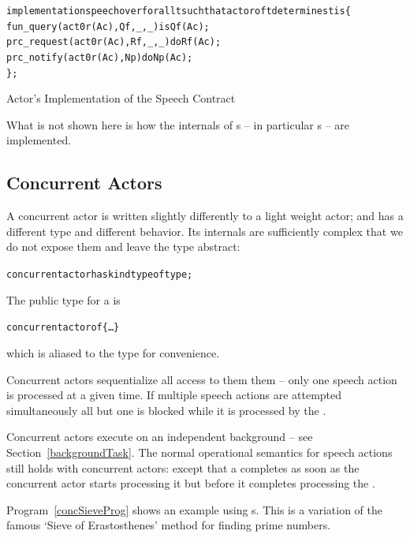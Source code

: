 \begin{program}
\begin{alltt}
implementation speech over for all t such that actor of t determines t is \{
  fun \_query(act0r(Ac),Qf,_,_) is Qf(Ac);
  prc \_request(act0r(Ac),Rf,_,_) do Rf(Ac);
  prc \_notify(act0r(Ac),Np) do Np(Ac);
\};
\end{alltt}
\caption{Actor's Implementation of the Speech Contract}
\label{actorSpeechProg}
\end{program}
\begin{aside}
What is not shown here is how the internals of s -- in particular  s -- are implemented.
\end{aside}

\subsection{Concurrent Actors}
\label{concActor}
A concurrent actor is written slightly differently to a light weight actor; and has a different type and different behavior. Its internals are sufficiently complex that we do not expose them and leave the  type abstract:
\begin{alltt}
concurrent actor has kind type of type;
\end{alltt}
The public type for a  is 
\begin{alltt}
concurrent actor of \{ \ldots \}
\end{alltt}
which is aliased to the  type for convenience.

Concurrent actors sequentialize all access to them them -- only one speech action is processed at a given time. If multiple speech actions are attempted simultaneously all but one is blocked while it is processed by the .

Concurrent actors execute on an independent background  -- see Section~\vref{backgroundTask}. The normal operational semantics for speech actions still holds with concurrent actors: except that a  completes as soon as the concurrent actor starts processing it but before it completes processing the .

Program~\vref{concSieveProg} shows an example using s. This is a variation of the famous `Sieve of Erastosthenes' method for finding prime numbers. 

